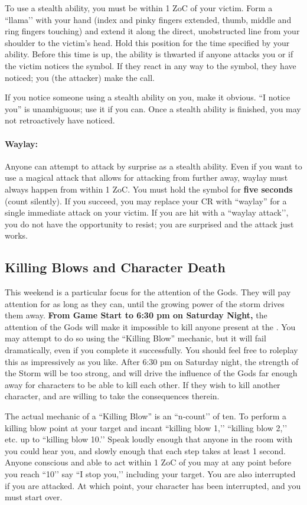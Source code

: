 \documentclass[sheet]{GL2020}
\begin{document}
To use a stealth ability, you must be within 1 ZoC of your victim. Form a ``llama’’ with your hand (index and pinky fingers extended, thumb, middle and ring fingers touching) and extend it along the direct, unobstructed line from your shoulder to the victim's head. Hold this position for the time specified by your ability. Before this time is up, the ability is thwarted if anyone attacks you or if the victim notices the symbol. If they react in any way to the symbol, they have noticed; you (the attacker) make the call.

If you notice someone using a stealth ability on you, make it obvious. ``I notice you'' is unambiguous; use it if you can. Once a stealth ability is finished, you may not retroactively have noticed.

\paragraph{Waylay:} Anyone can attempt to attack by surprise as a stealth ability. Even if you want to use a magical attack that allows for attacking from further away, waylay must always happen from within 1 ZoC. You must hold the symbol for \textbf{five seconds} (count silently). If you succeed, you may replace your CR with ``waylay'' for a single immediate attack on your victim. If you are hit with a ``waylay attack’’, you do not have the opportunity to resist; you are surprised and the attack just works.

\subsection{Killing Blows and Character Death}

This weekend is a particular focus for the attention of the Gods. They will pay attention for as long as they can, until the growing power of the storm drives them away. \textbf{From Game Start to 6:30 pm on Saturday Night,} the attention of the Gods will make it impossible to kill anyone present at the \pSc{}. You may attempt to do so using the ``Killing Blow'' mechanic, but it will fail dramatically, even if you complete it successfully. You should feel free to roleplay this as impressively as you like. After 6:30 pm on Saturday night, the strength of the Storm will be too strong, and will drive the influence of the Gods far enough away for characters to be able to kill each other. If they wish to kill another character, and are willing to take the consequences therein.

The actual mechanic of a ``Killing Blow'' is an ``n-count’’ of ten. To perform a killing blow point at your target and incant ``killing blow 1,’’ ``killing blow 2,’’ etc. up to ``killing blow 10.’’ Speak loudly enough that anyone in the room with you could hear you, and slowly enough that each step takes at least 1 second. Anyone conscious and able to act within 1 ZoC of you may at any point before you reach ``10’’ say ``I stop you,’’ including your target. You are also interrupted if you are attacked. At which point, your character has been interrupted, and you must start over.
\end{document}
